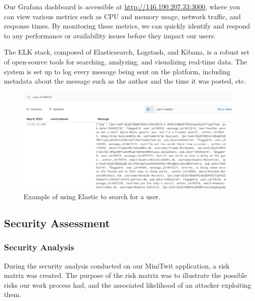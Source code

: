 Our Grafana dashboard is accessible at \url{http://146.190.207.33:3000}, where you can view various metrics such as CPU and memory usage, network traffic, and response times. By monitoring these metrics, we can quickly identify and respond to any performance or availability issues before they impact our users.

The ELK stack, composed of Elasticsearch, Logstash, and Kibana, is a robust set of open-source tools for searching, analyzing, and visualizing real-time data. The system is set up to log every message being sent on the platform, including metadata about the message such as the author and the time it was posted, etc. 

\begin{figure}[H]
  \centering
  \includegraphics[width=1\textwidth]{images/process_perspective/Logs.png}
  \caption{Example of using Elastic to search for a user.}
  \label{fig:44}
\end{figure}



\subsection{Security Assessment}
\subsubsection{Security Analysis}

During the security analysis conducted on our MiniTwit application, a risk matrix was created. The purpose of the risk matrix was to illustrate the possible risks our work process had, and the associated likelihood of an attacker exploiting them.


